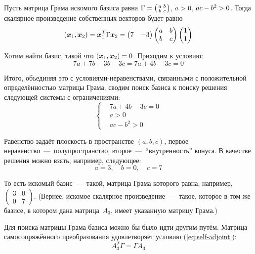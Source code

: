 \documentclass[a4paper,12pt]{article}
\theoremstyle{remark}
\begin{document}
\begin{solution}
    Пусть матрица Грама искомого базиса равна $\Gamma \hm= \left(\begin{smallmatrix}a & b\\ b & c\end{smallmatrix}\right)$, $a \hm> 0$, $ac \hm- b^2 \hm> 0$.
    Тогда скалярное произведение собственных векторов будет равно
    \[
      (\boldsymbol x_1, \boldsymbol x_2) = \boldsymbol x_1^T \Gamma \boldsymbol x_2
      = \begin{pmatrix}
        7 & -3
      \end{pmatrix} \begin{pmatrix}
        a & b\\
        b & c
      \end{pmatrix}
      \begin{pmatrix}
        1\\ 1
      \end{pmatrix}
    \]
    
    Хотим найти базис, такой что $(\bds x_1, \bds x_2) \hm= 0$.
    Приходим к условию:
    \[
      7a + 7b - 3b - 3c = 7a + 4b - 3c = 0
    \]
    
    Итого, объединяя это с условиями-неравенствами, связанными с положительной определённостью матрицы Грама, сводим поиск базиса к поиску решения следующей системы с ограничениями:
    \[
      \left\{
        \begin{aligned}
          &7a + 4b - 3c = 0\\
          &a > 0\\
          &ac - b^2 > 0
        \end{aligned}
      \right.
    \]
    
    Равенство задаёт плоскость в пространстве $(a, b, c)$, первое неравенство~---~полупространство, второе~---~``внутренность'' конуса.
    В качестве решения можно взять, например, следующее:
    \[
      a = 3,\quad b = 0,\quad c = 7
    \]
    
    То есть искомый базис~---~такой, матрица Грама которого равна, например, $\left(\begin{smallmatrix}3 & 0\\ 0 & 7\end{smallmatrix}\right)$.
    (Вернее, искомое скалярное произведение~---~такое, которое в том же базисе, в котором дана матрица~$A_3$, имеет указанную матрицу Грама.)
    
    \medskip
    
    Для поиска матрицы Грама базиса можно бы было идти другим путём.
    Матрица самосопряжённого преобразования удовлетворяет условию (\ref{eq:self-adjoint}):
    \[
      A_3^T \Gamma = \Gamma A_3
    \]
    

\end{solution}
\end{document}

